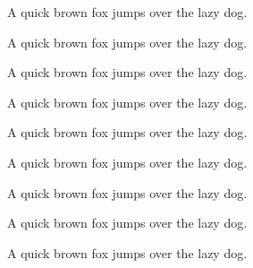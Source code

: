 \documentclass[12pt, jafontscale=0.9247]{jlreq}
\begin{document}
{  { A quick brown fox jumps over the lazy dog.}

  { A quick brown fox jumps over the lazy dog.}

  { A quick brown fox jumps over the lazy dog.}

  { A quick brown fox jumps over the lazy dog.}

  { A quick brown fox jumps over the lazy dog.}


  { A quick brown fox jumps over the lazy dog.}


  { A quick brown fox jumps over the lazy dog.}

  { A quick brown fox jumps over the lazy dog.}


  { A quick brown fox jumps over the lazy dog.}


  \bigskip

  \hrulefill

  \bigskip

}
\end{document}
